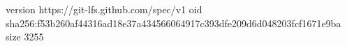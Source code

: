 version https://git-lfs.github.com/spec/v1
oid sha256:f53b260af44316ad18e37a434566064917c393dfe209d6d048203fcf1671e9ba
size 3255
